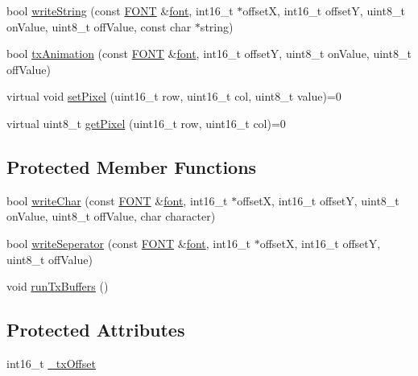 \begin{DoxyCompactItemize}
bool \hyperlink{classflame_1_1_display___monochrome_a1bf2a44cb642b6a16e09a690023fe959}{write\-String} (const \hyperlink{namespaceflame_a05350b61d7b7be486d5e367522316a33}{F\-O\-N\-T} \&\hyperlink{structflame_1_1font}{font}, int16\-\_\-t $\ast$offset\-X, int16\-\_\-t offset\-Y, uint8\-\_\-t on\-Value, uint8\-\_\-t off\-Value, const char $\ast$string)
\item 
bool \hyperlink{classflame_1_1_display___monochrome_a51ef95aa2e4a00a234987559fd350b27}{tx\-Animation} (const \hyperlink{namespaceflame_a05350b61d7b7be486d5e367522316a33}{F\-O\-N\-T} \&\hyperlink{structflame_1_1font}{font}, int16\-\_\-t offset\-Y, uint8\-\_\-t on\-Value, uint8\-\_\-t off\-Value)
\item 
virtual void \hyperlink{classflame_1_1_display___monochrome_a34002efa6fccb74a4fbea455f2a261d3}{set\-Pixel} (uint16\-\_\-t row, uint16\-\_\-t col, uint8\-\_\-t value)=0
\item 
virtual uint8\-\_\-t \hyperlink{classflame_1_1_display___monochrome_a24ddc06684641b00ee27b2630d216f8f}{get\-Pixel} (uint16\-\_\-t row, uint16\-\_\-t col)=0
\end{DoxyCompactItemize}
\subsection*{Protected Member Functions}
\begin{DoxyCompactItemize}
\item 
bool \hyperlink{classflame_1_1_display___monochrome_acd31faefdc5f7dd913718d66bb30a0da}{write\-Char} (const \hyperlink{namespaceflame_a05350b61d7b7be486d5e367522316a33}{F\-O\-N\-T} \&\hyperlink{structflame_1_1font}{font}, int16\-\_\-t $\ast$offset\-X, int16\-\_\-t offset\-Y, uint8\-\_\-t on\-Value, uint8\-\_\-t off\-Value, char character)
\item 
bool \hyperlink{classflame_1_1_display___monochrome_a652e0ebca82d3743a565a8b31dbbf4da}{write\-Seperator} (const \hyperlink{namespaceflame_a05350b61d7b7be486d5e367522316a33}{F\-O\-N\-T} \&\hyperlink{structflame_1_1font}{font}, int16\-\_\-t $\ast$offset\-X, int16\-\_\-t offset\-Y, uint8\-\_\-t off\-Value)
\item 
void \hyperlink{classflame_1_1_display___monochrome_a7f156eaedc986e5432c4b04968417def}{run\-Tx\-Buffers} ()
\end{DoxyCompactItemize}
\subsection*{Protected Attributes}
\begin{DoxyCompactItemize}
\item 
int16\-\_\-t \hyperlink{classflame_1_1_display___monochrome_abd53e31a2433730e2390152b7c24918f}{\-\_\-tx\-Offset}
\end{DoxyCompactItemize}


